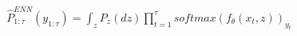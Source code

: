 \documentclass[preview]{standalone}
\begin{document}
\begin{align*}
\hat{P}_{1:\tau}^{ENN} (y_{1:\tau}) = \int_{z} P_z(dz) \prod_{t=1}^{\tau} softmax(f_\theta (x_t, z))_{y_t}
\end{align*}
\end{document}
